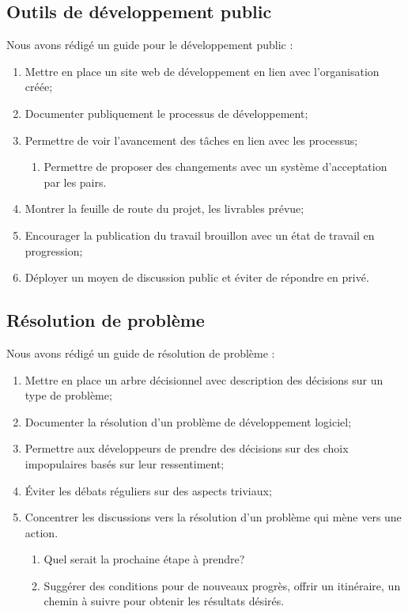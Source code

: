 \subsection{Outils de développement public}

Nous avons rédigé un guide pour le développement public :
\begin{enumerate}
    \item Mettre en place un site web de développement en lien avec l'organisation créée;
    \item Documenter publiquement le processus de développement;
    \item Permettre de voir l'avancement des tâches en lien avec les processus;
    \begin{enumerate}
        \item Permettre de proposer des changements avec un système d'acceptation par les pairs.
    \end{enumerate}
    \item Montrer la feuille de route du projet, les livrables prévue;
    \item Encourager la publication du travail brouillon avec un état de travail en progression;
    \item Déployer un moyen de discussion public et éviter de répondre en privé.
\end{enumerate}

\subsection{Résolution de problème}

Nous avons rédigé un guide de résolution de problème : 

\begin{enumerate}
    \item Mettre en place un arbre décisionnel avec description des décisions sur un type de problème;
    \item Documenter la résolution d'un problème de développement logiciel;
    \item Permettre aux développeurs de prendre des décisions sur des choix impopulaires basés sur leur ressentiment;
    \item Éviter les débats réguliers sur des aspects triviaux;
    \item Concentrer les discussions vers la résolution d'un problème qui mène vers une action.
    \begin{enumerate}
        \item Quel serait la prochaine étape à prendre?
        \item Suggérer des conditions pour de nouveaux progrès, offrir un itinéraire, un chemin à suivre pour obtenir les résultats désirés.
    \end{enumerate}
\end{enumerate}

